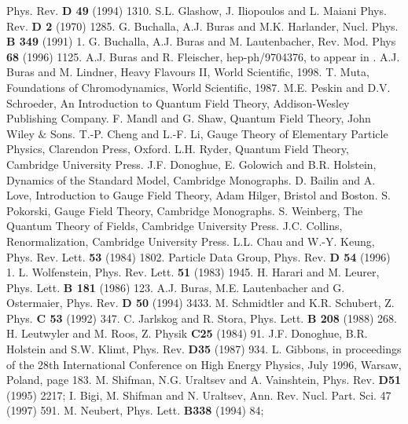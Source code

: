 \begin{thebibliography}{999}
{ Phys. Rev.} {\bf D 49} (1994) 1310.
{ S.L. Glashow, J. Iliopoulos and L. Maiani}
{ Phys. Rev.} {\bf D 2} (1970) 1285.
{ G. Buchalla, A.J. Buras and M.K. Harlander,} { Nucl. Phys.}
 {\bf B 349} (1991) 1.
{ G. Buchalla, A.J. Buras and M. Lautenbacher,} 
{ Rev. Mod. Phys} {\bf 68} (1996) 1125.
{ A.J. Buras and R. Fleischer,} hep-ph/9704376, to appear in \cite{HFII}.
A.J. Buras and M. Lindner, Heavy Flavours II, World Scientific,
1998.
T. Muta, Foundations of Chromodynamics, World Scientific, 1987.
M.E. Peskin and D.V. Schroeder, An Introduction to Quantum Field
Theory, Addison-Wesley Publishing Company.
F. Mandl and G. Shaw, Quantum Field Theory, John Wiley $\&$ Sons.
T.-P. Cheng and L.-F. Li, Gauge Theory of Elementary Particle
Physics, Clarendon Press, Oxford. 
L.H. Ryder, Quantum Field Theory, Cambridge University Press.
J.F. Donoghue, E. Golowich and B.R. Holstein, Dynamics of the
Standard Model, Cambridge Monographs.
D. Bailin and A. Love, Introduction to Gauge Field Theory,
Adam Hilger, Bristol and Boston.
S. Pokorski, Gauge Field Theory, Cambridge Monographs.
S. Weinberg, The Quantum Theory of Fields, Cambridge University
Press.
J.C. Collins, Renormalization, Cambridge University Press.
{ L.L. Chau and W.-Y. Keung}, 
{ Phys. Rev. Lett.} {\bf 53} (1984) 1802.
{ Particle Data Group,} { Phys. Rev.} {\bf D 54} (1996) 1.
{ L. Wolfenstein}, { Phys. Rev. Lett.} {\bf 51} (1983) 1945.
{ H. Harari and M. Leurer,} { Phys. Lett.} {\bf B 181} (1986) 123.
{ A.J. Buras, M.E. Lautenbacher and G. Ostermaier,}
{ Phys. Rev.} {\bf D 50} (1994) 3433.
{ M. Schmidtler and K.R. Schubert}, { Z. Phys.} {\bf C 53}
(1992) 347.
{ C. Jarlskog and R. Stora},
{ Phys. Lett.} {\bf B 208} (1988) 268.
{ H. Leutwyler and M. Roos}, { Z. Physik} {\bf C25} (1984) 91.
{ J.F. Donoghue, B.R. Holstein and S.W. Klimt,}
{ Phys. Rev.} {\bf D35} (1987) 934.
{ L. Gibbons}, in proceedings of the 28th International Conference
on High Energy Physics, July 1996, Warsaw, Poland, page 183.
{ M. Shifman, N.G. Uraltsev and A. Vainshtein,}
{ Phys. Rev.} {\bf D51} (1995) 2217;
I. Bigi, M. Shifman and N. Uraltsev, Ann. Rev. Nucl. Part. Sci.
47 (1997) 591.
{  M. Neubert,} { Phys. Lett.} {\bf B338} (1994) 84;

\end{thebibliography}
